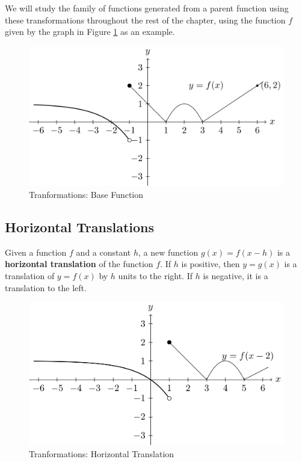 \documentclass[
]{book}
\theoremstyle{definition}
\theoremstyle{definition}
\theoremstyle{definition}
\theoremstyle{definition}
\theoremstyle{remark}
\begin{document}
We will study the family of functions generated from a parent function using these transformations throughout the rest of the chapter, using the function \(f\) given by the graph in Figure \ref{fig:base-function} as an example.

\begin{figure}

{\centering \includegraphics[width=0.8\linewidth]{tikz/base-function} 

}

\caption{Tranformations: Base Function}\label{fig:base-function}
\end{figure}

\hypertarget{horizontal-translations}{%
\subsection{Horizontal Translations}\label{horizontal-translations}}

Given a function \(f\) and a constant \(h\), a new function \(g(x)=f(x-h)\) is a \textbf{horizontal translation} of the function \(f\). If \(h\) is positive, then \(y=g(x)\) is a translation of \(y=f(x)\) by \(h\) units to the right. If \(h\) is negative, it is a translation to the left.

\begin{figure}

{\centering \includegraphics[width=0.8\linewidth]{tikz/horizontal-translation} 

}

\caption{Tranformations: Horizontal Translation}\label{fig:horizontal-translation}
\end{figure}
\end{document}
